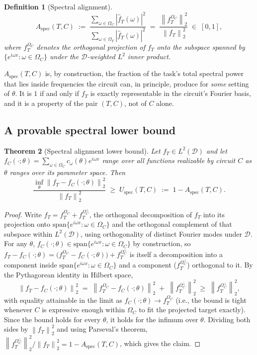 \documentclass[11pt]{article}
\newtheorem{theorem}{Theorem}[section]
\newtheorem{definition}[theorem]{Definition}
\newcommand{\Aspec}{A_{\mathrm{spec}}}
\newcommand{\norm}[1]{\left\lVert #1 \right\rVert}
\newcommand{\fT}{f_T}
\newcommand{\fC}{f_C}
\newcommand{\Omc}{\Omega_C}
\newcommand{\Omt}{\Omega_T}
\begin{document}
\begin{definition}[Spectral alignment]
\label{def:spectral-alignment}
\[
    \Aspec(T,C) \;:=\; \frac{\sum_{\omega \in \Omc} |\hat\fT(\omega)|^2}{\sum_{\omega \in \Omt} |\hat\fT(\omega)|^2} \;=\; \frac{\norm{\fT^{\Omc}}_2^2}{\norm{\fT}_2^2} \;\in\; [0,1],
\]
where $\fT^{\Omc}$ denotes the orthogonal projection of $\fT$ onto the subspace spanned by $\{e^{i\omega x} : \omega \in \Omc\}$ under the $\mathcal{D}$-weighted $L^2$ inner product.
\end{definition}

$\Aspec(T,C)$ is, by construction, the fraction of the task's total spectral power that lies inside frequencies the circuit can, in principle, produce for \emph{some} setting of $\theta$. It is $1$ if and only if $\fT$ is exactly representable in the circuit's Fourier basis, and it is a property of the pair $(T,C)$, not of $C$ alone.

\subsection{A provable spectral lower bound}

\begin{theorem}[Spectral alignment lower bound]
\label{thm:spectral-bound}
Let $\fT \in L^2(\mathcal{D})$ and let $\fC(\cdot;\theta) = \sum_{\omega \in \Omc} c_\omega(\theta) e^{i\omega x}$ range over all functions realizable by circuit $C$ as $\theta$ ranges over its parameter space. Then
\[
    \frac{\inf_\theta \norm{\fT - \fC(\cdot;\theta)}_2^2}{\norm{\fT}_2^2} \;\geq\; U_{\mathrm{spec}}(T,C) \;:=\; 1 - \Aspec(T,C).
\]
\end{theorem}

\begin{proof}
Write $\fT = \fT^{\Omc} + \fT^{\Omc^{\perp}}$, the orthogonal decomposition of $\fT$ into its projection onto $\mathrm{span}\{e^{i\omega x}:\omega \in \Omc\}$ and the orthogonal complement of that subspace within $L^2(\mathcal{D})$, using orthogonality of distinct Fourier modes under $\mathcal{D}$. For any $\theta$, $\fC(\cdot;\theta) \in \mathrm{span}\{e^{i\omega x} : \omega \in \Omc\}$ by construction, so $\fT - \fC(\cdot;\theta) = \big(\fT^{\Omc} - \fC(\cdot;\theta)\big) + \fT^{\Omc^{\perp}}$ is itself a decomposition into a component inside $\mathrm{span}\{e^{i\omega x}:\omega\in\Omc\}$ and a component ($\fT^{\Omc^\perp}$) orthogonal to it. By the Pythagorean identity in Hilbert space,
\[
    \norm{\fT - \fC(\cdot;\theta)}_2^2 \;=\; \norm{\fT^{\Omc} - \fC(\cdot;\theta)}_2^2 \;+\; \norm{\fT^{\Omc^{\perp}}}_2^2 \;\geq\; \norm{\fT^{\Omc^{\perp}}}_2^2,
\]
with equality attainable in the limit as $\fC(\cdot;\theta) \to \fT^{\Omc}$ (i.e., the bound is tight whenever $C$ is expressive enough within $\Omc$ to fit the projected target exactly). Since the bound holds for every $\theta$, it holds for the infimum over $\theta$. Dividing both sides by $\norm{\fT}_2^2$ and using Parseval's theorem, $\norm{\fT^{\Omc^\perp}}_2^2 / \norm{\fT}_2^2 = 1 - \Aspec(T,C)$, which gives the claim.
\end{proof}
\end{document}
